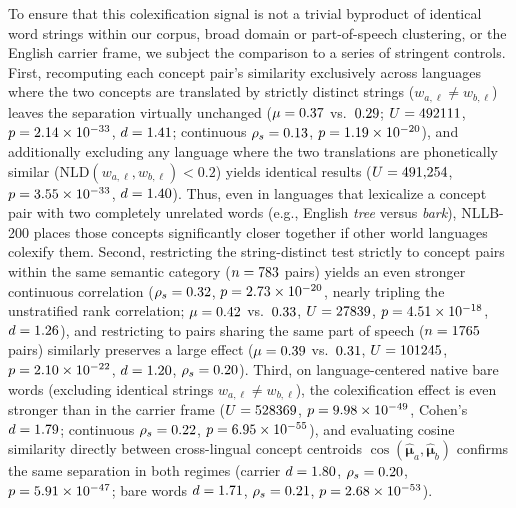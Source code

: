 To ensure that this colexification signal is not a trivial byproduct of identical word strings within our corpus, broad domain or part-of-speech clustering, or the English carrier frame, we subject the comparison to a series of stringent controls.
First, recomputing each concept pair's similarity exclusively across languages where the two concepts are translated by strictly distinct strings ($w_{a,\ell} \neq w_{b,\ell}$) leaves the separation virtually unchanged ($\mu = 0.37{}$ vs.\ $0.29{}$; $U = 492111{}$, $p = 2.14 \times 10^{-33}{}$, $d = 1.41{}$; continuous $\rho_s = 0.13{}$, $p = 1.19 \times 10^{-20}{}$), and additionally excluding any language where the two translations are phonetically similar ($\text{NLD}(w_{a,\ell}, w_{b,\ell}) < 0.2$) yields identical results ($U = 491{,}254{}$, $p = 3.55 \times 10^{-33}{}$, $d = 1.40{}$).
Thus, even in languages that lexicalize a concept pair with two completely unrelated words (e.g., English \emph{tree} versus \emph{bark}), NLLB-200 places those concepts significantly closer together if other world languages colexify them.
Second, restricting the string-distinct test strictly to concept pairs within the same semantic category ($n = 783{}$ pairs) yields an even stronger continuous correlation ($\rho_s = 0.32{}$, $p = 2.73 \times 10^{-20}{}$, nearly tripling the unstratified rank correlation; $\mu = 0.42{}$ vs.\ $0.33{}$, $U = 27839{}$, $p = 4.51 \times 10^{-18}{}$, $d = 1.26{}$), and restricting to pairs sharing the same part of speech ($n = 1765{}$ pairs) similarly preserves a large effect ($\mu = 0.39{}$ vs.\ $0.31{}$, $U = 101245{}$, $p = 2.10 \times 10^{-22}{}$, $d = 1.20{}$, $\rho_s = 0.20{}$).
Third, on language-centered native bare words (excluding identical strings $w_{a,\ell} \neq w_{b,\ell}$), the colexification effect is even stronger than in the carrier frame ($U = 528369{}$, $p = 9.98 \times 10^{-49}{}$, Cohen's $d = 1.79{}$; continuous $\rho_s = 0.22{}$, $p = 6.95 \times 10^{-55}{}$), and evaluating cosine similarity directly between cross-lingual concept centroids $\cos(\hat{\boldsymbol{\mu}}_a, \hat{\boldsymbol{\mu}}_b)$ confirms the same separation in both regimes (carrier $d = 1.80{}$, $\rho_s = 0.20{}$, $p = 5.91 \times 10^{-47}{}$; bare words $d = 1.71{}$, $\rho_s = 0.21{}$, $p = 2.68 \times 10^{-53}{}$).

